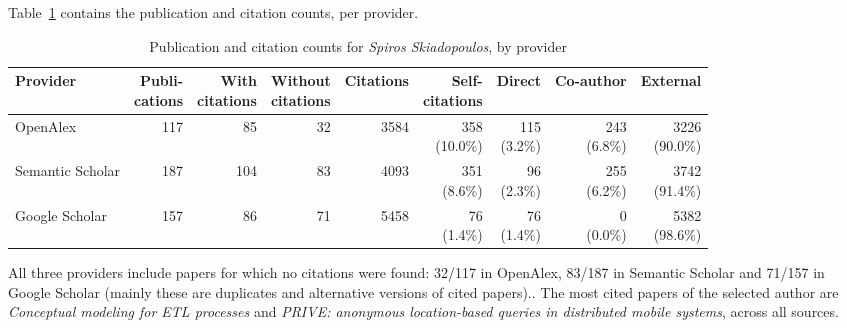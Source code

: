 Table~\ref{tab:provider-comparison} contains the publication and citation counts, per provider.

\begin{table}[tb]
    \centering
    \footnotesize
    \setlength{\tabcolsep}{3pt}
    \begin{tabular}{|l|r|r|r|r|r|r|r|r|}
        \hline
        Provider & \shortstack{Publi-\\cations} & \shortstack{With\\citations} & \shortstack{Without\\citations} & Citations & \shortstack{Self-\\citations} & Direct & Co-author & External \\
        \hline\hline
        \textsf{OpenAlex} & 117 & 85 & 32 & 3584 & \shortstack[r]{358\\(10.0\%)} & \shortstack[r]{115\\(3.2\%)} & \shortstack[r]{243\\(6.8\%)} & \shortstack[r]{3226\\(90.0\%)} \\
        \textsf{Semantic Scholar} & 187 & 104 & 83 & 4093 & \shortstack[r]{351\\(8.6\%)} & \shortstack[r]{96\\(2.3\%)} & \shortstack[r]{255\\(6.2\%)} & \shortstack[r]{3742\\(91.4\%)} \\
        \textsf{Google Scholar} & 157 & 86 & 71 & 5458 & \shortstack[r]{76\\(1.4\%)} & \shortstack[r]{76\\(1.4\%)} & \shortstack[r]{0\\(0.0\%)} & \shortstack[r]{5382\\(98.6\%)} \\
        \hline
    \end{tabular}
    \caption{Publication and citation counts for \emph{Spiros Skiadopoulos}, by provider}
    \label{tab:provider-comparison}
\end{table}

All three providers include papers for which no citations were found: 32/117 in \textsf{OpenAlex}, 83/187 in \textsf{Semantic Scholar} and 71/157 in \textsf{Google Scholar} (mainly these are duplicates and alternative versions of cited papers)..
The most cited papers of the selected author are \emph{Conceptual modeling for ETL processes} and \emph{PRIVE: anonymous location-based queries in distributed mobile systems}, across all sources.

